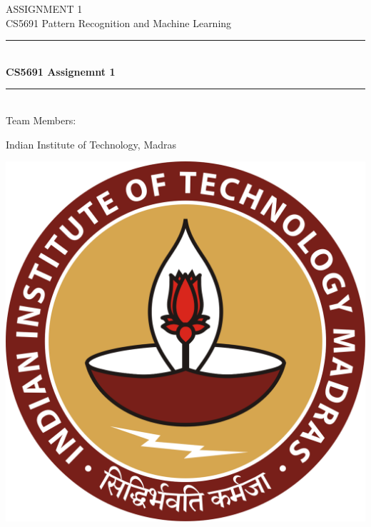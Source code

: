 \documentclass[12pt,a4paper]{article}
\begin{document}
    \begin{titlepage} 
        \begin{center}
        \large{ASSIGNMENT 1}\\
        \vspace{2em}
        \large {CS5691 Pattern Recognition and Machine Learning}
        \vspace{3em}
        
        \rule{0.9\linewidth}{0.5mm} \\[0.4cm]
        {\Large{\bfseries{CS5691 Assignemnt 1}}} \\
        \rule{0.9\linewidth}{0.5mm} \\[3 em]    
        
        Team Members: \\
        \vspace{0.5em}
        

        \vspace{1em}

        Indian Institute of Technology, Madras\\    
        
        \vspace{5em}    
        
            \includegraphics[scale = 0.09]{images/iitmlogo.png}
        \end{center}
    \end{titlepage}
{\hypersetup{linkcolor=black}
\tableofcontents}
\break
\end{document}
